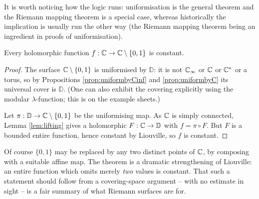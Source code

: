 \documentclass[a4paper]{scrartcl}
\newcommand{\Cinf}{\C_\infty}
\newcommand{\disc}{\mathbb{D}}
\newcommand{\Cs}{\C^*}
\begin{document}
It is worth noticing how the logic runs: uniformisation is the general theorem and the
Riemann mapping theorem is a special case, whereas historically the implication is
usually run the other way (the Riemann mapping theorem being an ingredient in proofs of
uniformisation).

\begin{theorem}
	Every holomorphic function $f : \mathbb{C} \to \mathbb{C}\setminus\{0,1\}$ is constant.
\end{theorem}

\begin{proof}
	The surface $\mathbb{C}\setminus\{0,1\}$ is uniformised by $\disc$: it is not $\Cinf$ or $\mathbb{C}$
	or $\Cs$ or a torus, so by Propositions \ref{prop:uniformbyCinf} and
	\ref{prop:uniformbyC} its universal cover is $\disc$. (One can also exhibit the covering
	explicitly using the modular $\lambda$-function; this is on the example sheets.)

	Let $\pi : \disc \to \C\setminus\{0,1\}$ be the uniformising map. As $\mathbb{C}$ is simply
	connected, Lemma \ref{lem:lifting} gives a holomorphic $F : \C \to \disc$ with
	$f = \pi\circ F$. But $F$ is a bounded entire function, hence constant by Liouville, so
	$f$ is constant.
\end{proof}

Of course $\{0,1\}$ may be replaced by any two distinct points of $\mathbb{C}$, by composing with
a suitable affine map. The theorem is a dramatic strengthening of Liouville: an entire
function which omits merely \emph{two} values is constant. That such a statement should
follow from a covering-space argument -- with no estimate in sight -- is a fair summary of
what Riemann surfaces are for.
\end{document}
